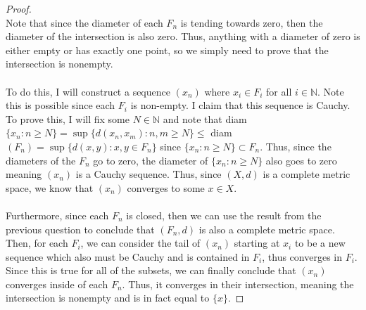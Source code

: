 \documentclass[10pt,a4paper]{article}
\theoremstyle{definition}
\theoremstyle{definition}
\begin{document}
\begin{proof}$ $
\\Note that since the diameter of each $F_n$ is tending towards zero, then the diameter of the intersection is also zero. Thus, anything with a diameter of zero is either empty or has exactly one point, so we simply need to prove that the intersection is nonempty. 
\\
\\To do this, I will construct a sequence $(x_n)$ where $x_i \in F_i$ for all $i \in \mathbb{N}$. Note this is possible since each $F_i$ is non-empty. I claim that this sequence is Cauchy. To prove this, I will fix some $N \in \mathbb{N}$ and note that diam$\{x_n : n \geq N\} = \sup\{d(x_n, x_m) : n, m \geq N\} \leq $ diam$(F_n) = \sup\{d(x, y) : x, y \in F_n\}$ since $\{x_n : n \geq N\} \subset F_n$. Thus, since the diameters of the $F_n$ go to zero, the diameter of $\{x_n : n \geq N\}$ also goes to zero meaning $(x_n)$ is a Cauchy sequence. Thus, since $(X, d)$ is a complete metric space, we know that $(x_n)$ converges to some $x \in X$.
\\
\\Furthermore, since each $F_n$ is closed, then we can use the result from the previous question to conclude that $(F_n, d)$ is also a complete metric space. Then, for each $F_i$, we can consider the tail of $(x_n)$ starting at $x_i$ to be a new sequence which also must be Cauchy and is contained in $F_i$, thus converges in $F_i$. Since this is true for all of the subsets, we can finally conclude that $(x_n)$ converges inside of each $F_n$. Thus, it converges in their intersection, meaning the intersection is nonempty and is in fact equal to $\{x\}$. 
\end{proof}
\end{document}
